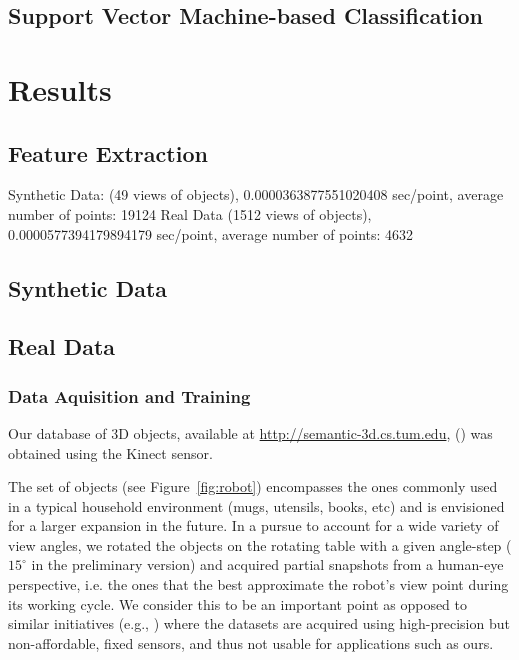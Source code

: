 \documentclass[conference]{sty/IEEEtran}
\begin{document}
\subsection{Support Vector Machine-based Classification}

\section{Results}
\label{sec:results}
\subsection{Feature Extraction}
Synthetic Data: (49 views of objects), 0.0000363877551020408 sec/point, average number of points: 19124
Real Data (1512 views of objects), 0.0000577394179894179  sec/point,  average number of points: 4632

\subsection{Synthetic Data}
\subsection{Real Data}
\subsubsection{Data Aquisition and Training}

Our database of 3D objects, available at \url{http://semantic-3d.cs.tum.edu},
() was obtained using the Kinect sensor.

The set of objects (see Figure~\ref{fig:robot}) encompasses the ones commonly used
in a typical household environment (mugs, utensils, books, etc) and is envisioned for a
larger expansion in the future.  In a pursue to account for a wide variety
of view angles, we rotated the objects on the rotating table with a given
angle-step ($15^\circ$ in the preliminary version) and acquired partial
snapshots from a human-eye perspective, i.e. the ones that the best
approximate the robot's view point during its working cycle.  We consider
this to be an important point as opposed to similar initiatives (e.g.,
\cite{kit}) where the datasets are acquired using high-precision but
non-affordable, fixed sensors, and thus not usable for applications such as ours.
\end{document}
